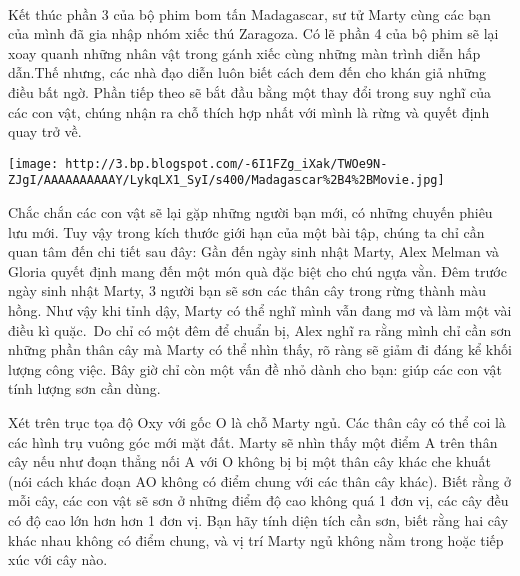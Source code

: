  

Kết thúc phần 3 của bộ phim bom tấn Madagascar, sư tử Marty cùng các bạn của mình đã gia nhập nhóm xiếc thú Zaragoza. Có lẽ phần 4 của bộ phim sẽ lại xoay quanh những nhân vật trong gánh xiếc cùng những màn trình diễn hấp dẫn.Thế nhưng, các nhà đạo diễn luôn biết cách đem đến cho khán giả những điều bất ngờ. Phần tiếp theo sẽ bắt đầu bằng một thay đổi trong suy nghĩ của các con vật, chúng nhận ra chỗ thích hợp nhất với mình là rừng và quyết định quay trở về.


\texttt{[image: http://3.bp.blogspot.com/-6I1FZg\_iXak/TWOe9N-ZJgI/AAAAAAAAAAY/LykqLX1\_SyI/s400/Madagascar\%2B4\%2BMovie.jpg]}

Chắc chắn các con vật sẽ lại gặp những người bạn mới, có những chuyến phiêu lưu mới. Tuy vậy trong kích thước giới hạn của một bài tập, chúng ta chỉ cần quan tâm đến chi tiết sau đây: Gần đến ngày sinh nhật Marty, Alex Melman và Gloria quyết định mang đến một món quà đặc biệt cho chú ngựa vằn. Đêm trước ngày sinh nhật Marty, 3 người bạn sẽ sơn các thân cây trong rừng thành màu hồng. Như vậy khi tỉnh dậy, Marty có thể nghĩ mình vẫn đang mơ và làm một vài điều kì quặc. Do chỉ có một đêm để chuẩn bị, Alex nghĩ ra rằng mình chỉ cần sơn những phần thân cây mà Marty có thể nhìn thấy, rõ ràng sẽ giảm đi đáng kể khối lượng công việc. Bây giờ chỉ còn một vấn đề nhỏ dành cho bạn: giúp các con vật tính lượng sơn cần dùng.

Xét trên trục tọa độ Oxy với gốc O là chỗ Marty ngủ. Các thân cây có thể coi là các hình trụ vuông góc mới mặt đất. Marty sẽ nhìn thấy một điểm A trên thân cây nếu như đoạn thẳng nối A với O không bị bị một thân cây khác che khuất (nói cách khác đoạn AO không có điểm chung với các thân cây khác). Biết rằng ở mỗi cây, các con vật sẽ sơn ở những điểm độ cao không quá 1 đơn vị, các cây đều có độ cao lớn hơn hơn 1 đơn vị. Bạn hãy tính diện tích cần sơn, biết rằng hai cây khác nhau không có điểm chung, và vị trí Marty ngủ không nằm trong hoặc tiếp xúc với cây nào.